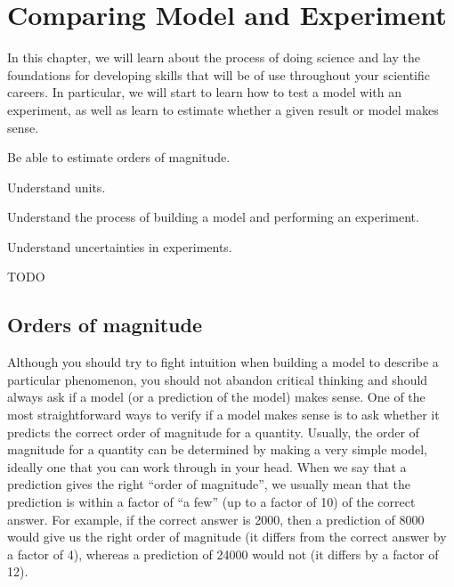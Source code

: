 %
\chapter{Comparing Model and Experiment}
\label{chap:modelandexperiment}
In this chapter, we will learn about the process of doing science and lay the foundations for developing skills that will be of use throughout your scientific careers. In particular, we will start to learn how to test a model with an experiment, as well as learn to estimate whether a given result or model makes sense.
\begin{learningObjectives}{
\item Be able to estimate orders of magnitude.
\item Understand units.
\item Understand the process of building a model and performing an experiment.
\item Understand uncertainties in experiments.}
\end{learningObjectives}
\begin{opening}
TODO
\end{opening}

\section{Orders of magnitude}
Although you should try to fight intuition when building a model to describe a particular phenomenon, you should not abandon critical thinking and should always ask if a model (or a prediction of the model) makes sense. One of the most straightforward ways to verify if a model makes sense is to ask whether it predicts the correct order of magnitude for a quantity. Usually, the order of magnitude for a quantity can be determined by making a very simple model, ideally one that you can work through in your head. When we say that a prediction gives the right ``order of magnitude'', we usually mean that the prediction is within a factor of ``a few'' (up to a factor of 10) of the correct answer. For example, if the correct answer is 2000, then a prediction of 8000 would give us the right order of magnitude (it differs from the correct answer by a factor of 4), whereas a prediction of 24000 would not (it differs by a factor of 12). 

